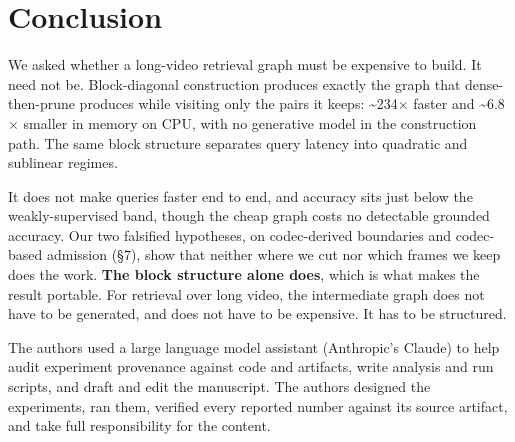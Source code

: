 \documentclass[sigconf,review,anonymous]{acmart}
\begin{document}
\section{Conclusion}

We asked whether a long-video retrieval graph must be expensive to build. It need not be.
Block-diagonal construction produces exactly the graph that dense-then-prune produces while
visiting only the pairs it keeps: \textasciitilde234\ensuremath{\times} faster and \textasciitilde6.8\ensuremath{\times} smaller in memory on CPU,
with no generative model in the construction path. The same block structure separates query
latency into quadratic and sublinear regimes.

It does not make queries faster end to end, and accuracy sits just below the weakly-supervised
band, though the cheap graph costs no detectable grounded accuracy. Our two falsified hypotheses, on codec-derived boundaries and codec-based
admission (§7), show that neither where we cut nor which frames we keep does the work.
\textbf{The block structure alone does}, which is what makes the result portable. For retrieval
over long video, the intermediate graph does not have to be generated, and does not have to be
expensive. It has to be structured.

\begin{acks}
The authors used a large language model assistant (Anthropic's Claude) to help audit experiment
provenance against code and artifacts, write analysis and run scripts, and draft and edit the
manuscript. The authors designed the experiments, ran them, verified every reported number
against its source artifact, and take full responsibility for the content.
\end{acks}



\end{document}
